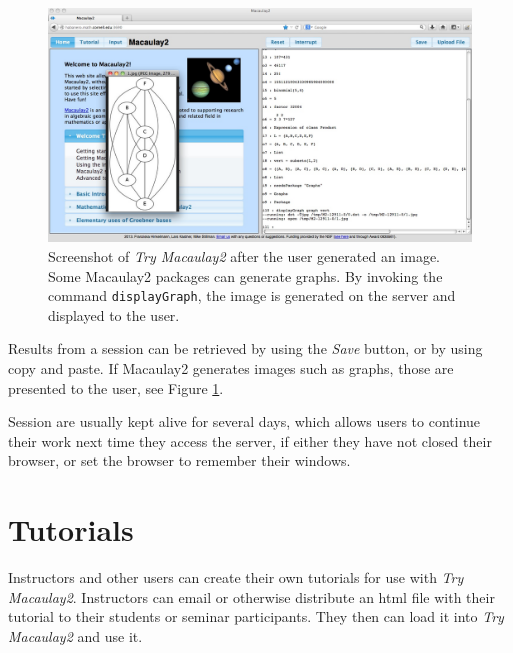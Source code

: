 \documentclass[]{article}
\def\tryM2{{\it Try Macaulay2}}
\begin{document}

\begin{figure}[htb]
    \includegraphics[width=.95\textwidth]{withGraph.jpg}
    \caption{Screenshot of \tryM2 after the user
      generated an image. Some Macaulay2 packages can generate
      graphs. By invoking the command {\tt displayGraph}, the image is
      generated on the server and displayed to the user.}
    \label{fig:graph}
\end{figure}

Results from a session can be retrieved by using the {\it Save}
button, or by using copy and paste. If Macaulay2 generates
images such as graphs, those are presented to the user, see Figure \ref{fig:graph}.


Session are usually kept alive for several days, which allows users to
continue their work next time they access the server, if either they
have not closed their browser, or set the browser to remember their
windows.

\section{Tutorials}
Instructors and other users can create their own tutorials for use with \tryM2. Instructors can email or otherwise distribute an html file with their tutorial to their students or seminar participants. They then can load it into \tryM2 and use it. 
\end{document}
